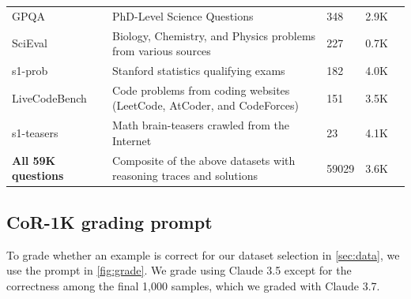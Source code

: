 \documentclass{article}
\theoremstyle{plain}
\theoremstyle{definition}
\theoremstyle{remark}
\newcommand{\data}{\textbf{CoR-1K}}
\begin{document}
\begin{table}[htbp]
\begin{tabular}{>{\raggedright}p{4.7cm} p{5.4cm} p{1.2cm} p{1.2cm} p{1.2cm}}
GPQA~\citep{rein2023gpqagraduatelevelgoogleproofqa} & PhD-Level Science Questions & 348 & 2.9K \\
SciEval~\citep{sun2024scievalmultilevellargelanguage} & Biology, Chemistry, and Physics problems from various sources & 227 & 0.7K \\
s1-prob & Stanford statistics qualifying exams & 182 & 4.0K \\
LiveCodeBench~\citep{jain2024livecodebenchholisticcontaminationfree} & Code problems from coding websites (LeetCode, AtCoder, and CodeForces) &  151 & 3.5K\\
s1-teasers & Math brain-teasers crawled from the Internet & 23 & 4.1K \\
\midrule
\textbf{All 59K questions} & Composite of the above datasets with reasoning traces and solutions & 59029 & 3.6K \\
\bottomrule
\end{tabular}
\label{tab:ds}
\end{table}

\FloatBarrier

\subsection{\data{} grading prompt}
\label{sec:grading}

To grade whether an example is correct for our dataset selection in \autoref{sec:data}, we use the prompt in \autoref{fig:grade}. We grade using Claude 3.5 except for the correctness among the final 1,000 samples, which we graded with Claude 3.7.
\end{document}

